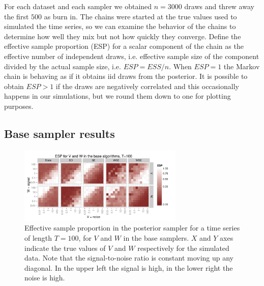 \documentclass{article}
\begin{document}
For each dataset and each sampler we obtained $n=3000$ draws and threw away the first $500$ as burn in. The chains were started at the true values used to simulated the time series, so we can examine the behavior of the chains to determine how well they mix but not how quickly they converge. Define the effective sample proportion (ESP) for a scalar component of the chain as the effective number of independent draws, i.e. effective sample size \cite{gelman2003bayesian} of the component divided by the actual sample size, i.e. $ESP=ESS/n$. When $ESP=1$ the Markov chain is behaving as if it obtains iid draws from the posterior. It is possible to obtain $ESP>1$ if the draws are negatively correlated and this occasionally happens in our simulations, but we round them down to one for plotting purposes.

\subsection{Base sampler results}

\begin{figure}[!ht]
\centering
\includegraphics[width=0.7\textwidth]{baseESplot100}
\caption{Effective sample proportion in the posterior sampler for a time series of length $T=100$, for $V$ and $W$ in the base samplers. $X$ and $Y$ axes indicate the true values of $V$ and $W$ respectively for the simulated data. Note that the signal-to-noise ratio is constant moving up any diagonal. In the upper left the signal is high, in the lower right the noise is high.}
\label{baseESplot}
\end{figure}
\end{document}
